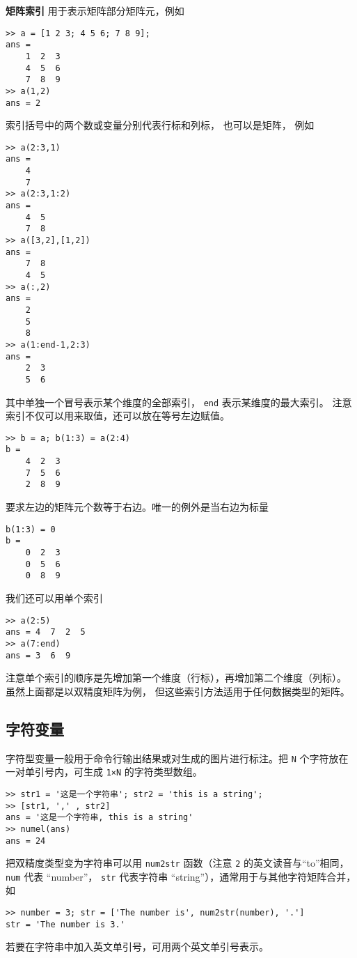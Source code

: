 \textbf{矩阵索引} 用于表示矩阵部分矩阵元，例如
\begin{lstlisting}[language=matlabC]
>> a = [1 2 3; 4 5 6; 7 8 9];
ans =
    1  2  3
    4  5  6
    7  8  9
>> a(1,2)
ans = 2
\end{lstlisting}
索引括号中的两个数或变量分别代表行标和列标， 也可以是矩阵， 例如
\begin{lstlisting}[language=matlabC]
>> a(2:3,1)
ans =
    4
    7
>> a(2:3,1:2)
ans =
    4  5
    7  8
>> a([3,2],[1,2])
ans =
    7  8
    4  5
>> a(:,2)
ans =
    2
    5
    8
>> a(1:end-1,2:3)
ans =
    2  3
    5  6
\end{lstlisting}
其中单独一个冒号表示某个维度的全部索引， \verb|end| 表示某维度的最大索引。 注意索引不仅可以用来取值，还可以放在等号左边赋值。
\begin{lstlisting}[language=matlabC]
>> b = a; b(1:3) = a(2:4)
b =
    4  2  3
    7  5  6
    2  8  9
\end{lstlisting}
要求左边的矩阵元个数等于右边。唯一的例外是当右边为标量
\begin{lstlisting}[language=matlabC]
b(1:3) = 0
b =
    0  2  3
    0  5  6
    0  8  9 
\end{lstlisting}
我们还可以用单个索引 %
\begin{lstlisting}[language=matlabC]
>> a(2:5)
ans = 4  7  2  5
>> a(7:end)
ans = 3  6  9
\end{lstlisting}
注意单个索引的顺序是先增加第一个维度（行标），再增加第二个维度（列标）。 虽然上面都是以双精度矩阵为例， 但这些索引方法适用于任何数据类型的矩阵。

\subsection{字符变量}

字符型变量一般用于命令行输出结果或对生成的图片进行标注。把 \verb|N| 个字符放在一对单引号内，可生成 \verb|1×N| 的字符类型数组。
\begin{lstlisting}[language=matlabC]
>> str1 = '这是一个字符串'; str2 = 'this is a string';
>> [str1, ',' , str2]
ans = '这是一个字符串, this is a string'
>> numel(ans)
ans = 24
\end{lstlisting}
把双精度类型变为字符串可以用 \verb|num2str| 函数（注意 \verb|2| 的英文读音与“to”相同， \verb|num| 代表 “number”， \verb|str| 代表字符串 “string”），通常用于与其他字符矩阵合并，如
\begin{lstlisting}[language=matlabC]
>> number = 3; str = ['The number is', num2str(number), '.']
str = 'The number is 3.'
\end{lstlisting}
若要在字符串中加入英文单引号，可用两个英文单引号表示。

